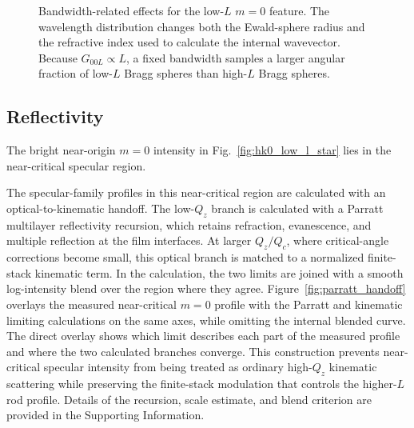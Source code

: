 \begin{figure}[H]
  \centering

  \begin{minipage}[t]{0.48\linewidth}
    \centering
  \end{minipage}
  \hfill
  \begin{minipage}[t]{0.48\linewidth}
    \centering
  \end{minipage}

  \caption[Bandwidth-related effects for the low-L feature]{Bandwidth-related effects for the low-\(L\)
  \(m=0\) feature. The wavelength distribution changes both the Ewald-sphere
  radius and the refractive index used to calculate the internal wavevector.
  Because \(G_{00L}\propto L\), a fixed bandwidth samples a larger angular
  fraction of low-\(L\) Bragg spheres than high-\(L\) Bragg spheres.}
  \label{fig:correlated_bragg_sphere_size_series}
\end{figure}

\subsection{Reflectivity}
\label{sec:reflectivity}

The bright near-origin \(m=0\) intensity in Fig.~\ref{fig:hk0_low_l_star} lies in the near-critical specular region.

The specular-family profiles in this near-critical region are calculated with an
optical-to-kinematic handoff. The low-\(Q_z\) branch is calculated with a Parratt
multilayer reflectivity recursion, which retains refraction, evanescence, and
multiple reflection at the film interfaces.\cite{Parratt1954} At larger
\(Q_z/Q_c\), where critical-angle corrections become small, this optical branch
is matched to a normalized finite-stack kinematic term. In the calculation, the
two limits are joined with a smooth log-intensity blend over the region where
they agree. Figure~\ref{fig:parratt_handoff} overlays the measured near-critical
\(m=0\) profile with the Parratt and kinematic limiting calculations on the same
axes, while omitting the internal blended curve. The direct overlay shows which
limit describes each part of the measured profile and where the two calculated
branches converge. This construction prevents near-critical specular intensity
from being treated as ordinary high-\(Q_z\) kinematic scattering while
preserving the finite-stack modulation that controls the higher-\(L\) rod
profile. Details of the recursion, scale estimate, and blend criterion are
provided in the Supporting Information.

